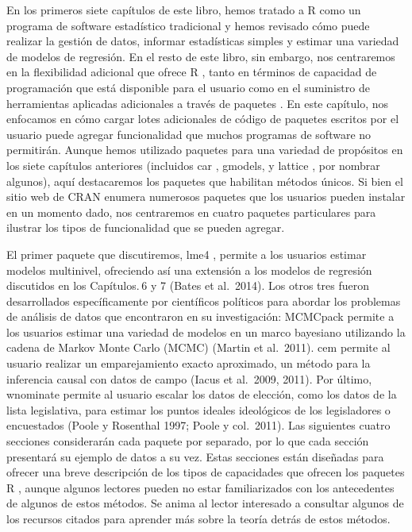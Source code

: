 \documentclass[
]{book}
\begin{document}
En los primeros siete capítulos de este libro, hemos tratado a R como un programa de software estadístico tradicional y hemos revisado cómo puede realizar la gestión de datos, informar estadísticas simples y estimar una variedad de modelos de regresión. En el resto de este libro, sin embargo, nos centraremos en la flexibilidad adicional que ofrece R , tanto en términos de capacidad de programación que está disponible para el usuario como en el suministro de herramientas aplicadas adicionales a través de paquetes . En este capítulo, nos enfocamos en cómo cargar lotes adicionales de código de paquetes escritos por el usuario puede agregar funcionalidad que muchos programas de software no permitirán. Aunque hemos utilizado paquetes para una variedad de propósitos en los siete capítulos anteriores (incluidos car , gmodels, y lattice , por nombrar algunos), aquí destacaremos los paquetes que habilitan métodos únicos. Si bien el sitio web de CRAN enumera numerosos paquetes que los usuarios pueden instalar en un momento dado, nos centraremos en cuatro paquetes particulares para ilustrar los tipos de funcionalidad que se pueden agregar.

El primer paquete que discutiremos, lme4 , permite a los usuarios estimar modelos multinivel, ofreciendo así una extensión a los modelos de regresión discutidos en los Capítulos. 6 y 7 (Bates et al.~2014). Los otros tres fueron desarrollados específicamente por científicos políticos para abordar los problemas de análisis de datos que encontraron en su investigación: MCMCpack permite a los usuarios estimar una variedad de modelos en un marco bayesiano utilizando la cadena de Markov Monte Carlo (MCMC) (Martin et al.~2011). cem permite al usuario realizar un emparejamiento exacto aproximado, un método para la inferencia causal con datos de campo (Iacus et al.~2009, 2011). Por último, wnominate permite al usuario escalar los datos de elección, como los datos de la lista legislativa, para estimar los puntos ideales ideológicos de los legisladores o encuestados (Poole y Rosenthal 1997; Poole y col.~2011). Las siguientes cuatro secciones considerarán cada paquete por separado, por lo que cada sección presentará su ejemplo de datos a su vez. Estas secciones están diseñadas para ofrecer una breve descripción de los tipos de capacidades que ofrecen los paquetes R , aunque algunos lectores pueden no estar familiarizados con los antecedentes de algunos de estos métodos. Se anima al lector interesado a consultar algunos de los recursos citados para aprender más sobre la teoría detrás de estos métodos.
\end{document}
